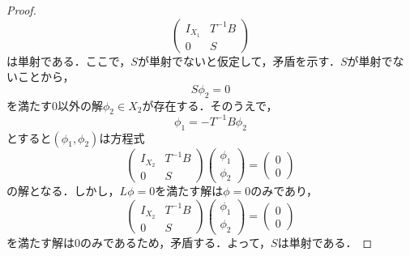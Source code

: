 \documentclass[11pt,a4paper,titlepage]{jsreport}
\theoremstyle{definition}
\begin{document}
\begin{proof}
\begin{equation*}
\begin{pmatrix}
      I_{X_1} & T^{-1}B \\
      0 & S
    \end{pmatrix}
  \end{equation*}
  は単射である．ここで，$S$が単射でないと仮定して，矛盾を示す．$S$が単射でないことから，
  \begin{equation*}
    S\phi_2=0
  \end{equation*}
  を満たす$0$以外の解$\phi_2 \in X_2$が存在する．そのうえで，
  \begin{equation*}
    \phi_1 = -T^{-1}B\phi_2
  \end{equation*}
  とすると$(\phi_1, \phi_2)$は方程式
  \begin{equation*}
    \begin{pmatrix}
      I_{X_2} & T^{-1}B \\
      0 & S
    \end{pmatrix}
    \begin{pmatrix}
      \phi_1 \\
      \phi_2
    \end{pmatrix}
    =
    \begin{pmatrix}
      0 \\
      0
    \end{pmatrix}
  \end{equation*}
  の解となる．しかし，$L\phi=0$を満たす解は$\phi=0$のみであり，
  \begin{equation*}
    \begin{pmatrix}
      I_{X_2} & T^{-1}B \\
      0 & S
    \end{pmatrix}
    \begin{pmatrix}
      \phi_1 \\
      \phi_2
    \end{pmatrix}
    =
    \begin{pmatrix}
      0 \\
      0
    \end{pmatrix}
  \end{equation*}
  を満たす解は$0$のみであるため，矛盾する．よって，$S$は単射である．


\end{proof}
\end{document}
